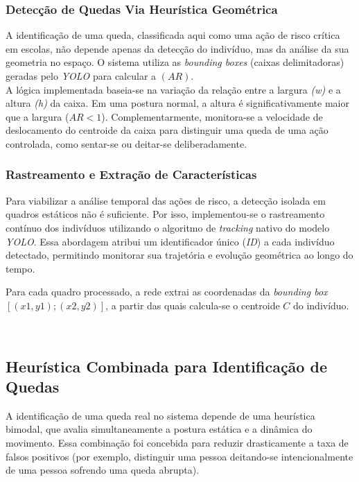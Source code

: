 \documentclass[12pt]{article}
\begin{document}
\subsubsection{Detecção de Quedas Via Heurística Geométrica}

A identificação de uma queda, classificada aqui como uma ação de risco crítica em escolas,
não depende apenas da detecção do indivíduo, mas da análise da sua geometria no espaço. O sistema
utiliza as \textit{bounding boxes} (caixas delimitadoras) geradas pelo \textit{YOLO} para calcular a $(AR)$.
\\

A lógica implementada baseia-se na variação da relação entre a largura \textit{(w)} e 
a altura \textit{(h)} da caixa. Em uma postura normal, a altura é significativamente maior que a largura ($AR < 1 $).
Complementarmente, monitora-se a velocidade de deslocamento do centroide da caixa para distinguir
uma queda de uma ação controlada, como sentar-se ou deitar-se deliberadamente.

\subsubsection{Rastreamento e Extração de Características}

Para viabilizar a análise temporal das ações de risco, a detecção isolada em quadros estáticos não é suficiente.
Por isso, implementou-se o rastreamento contínuo dos indivíduos utilizando o algoritmo de 
\textit{tracking} nativo do modelo \textit{YOLO}. Essa abordagem atribui um identificador único (\textit{ID}) a
cada indivíduo detectado, permitindo monitorar sua trajetória e evolução geométrica ao longo do tempo.

Para cada quadro processado, a rede extrai as coordenadas da \textit{bounding box} $[(x1, y1); (x2, y2)]$,
a partir das quais calcula-se o centroide $C$ do indivíduo.

\\


\subsection{Heurística Combinada para Identificação de Quedas}

A identificação de uma queda real no sistema depende de uma heurística bimodal, que avalia simultaneamente a
postura estática e a dinâmica do movimento. Essa combinação foi concebida para reduzir drasticamente
a taxa de falsos positivos (por exemplo, distinguir uma pessoa deitando-se intencionalmente de uma pessoa
sofrendo uma queda abrupta).
\end{document}
